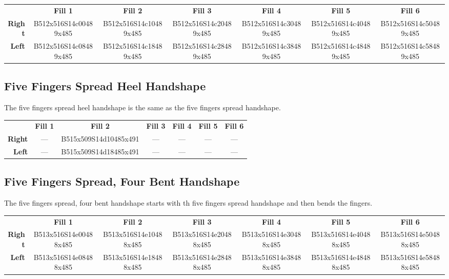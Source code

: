 \documentclass{article}
\begin{document}
\begin{center}
\begin{tabular}{r*{6}{c}}
&\textbf{Fill 1}&\textbf{Fill 2}&\textbf{Fill 3}&\textbf{Fill 4}&\textbf{Fill 5}&\textbf{Fill 6}\\
\textbf{Right}&
B512x516S14c00489x485&
B512x516S14c10489x485&
B512x516S14c20489x485&
B512x516S14c30489x485&
B512x516S14c40489x485&
B512x516S14c50489x485\\
\textbf{Left}&
B512x516S14c08489x485&
B512x516S14c18489x485&
B512x516S14c28489x485&
B512x516S14c38489x485&
B512x516S14c48489x485&
B512x516S14c58489x485\\
\end{tabular}
\end{center}

\subsection{Five Fingers Spread Heel Handshape}

The five fingers spread heel handshape is the same as the five fingers spread handshape.

\begin{center}
\begin{tabular}{r*{6}{c}}
&\textbf{Fill 1}&\textbf{Fill 2}&\textbf{Fill 3}&\textbf{Fill 4}&\textbf{Fill 5}&\textbf{Fill 6}\\
\textbf{Right}&
---&
B515x509S14d10485x491&
---&
---&
---&
---\\
\textbf{Left}&
---&
B515x509S14d18485x491&
---&
---&
---&
---\\
\end{tabular}
\end{center}

\subsection{Five Fingers Spread, Four Bent Handshape}

The five fingers spread, four bent handshape starts with th five fingers spread handshape and then bends the fingers.

\begin{center}
\begin{tabular}{r*{6}{c}}
&\textbf{Fill 1}&\textbf{Fill 2}&\textbf{Fill 3}&\textbf{Fill 4}&\textbf{Fill 5}&\textbf{Fill 6}\\
\textbf{Right}&
B513x516S14e00488x485&
B513x516S14e10488x485&
B513x516S14e20488x485&
B513x516S14e30488x485&
B513x516S14e40488x485&
B513x516S14e50488x485\\
\textbf{Left}&
B513x516S14e08488x485&
B513x516S14e18488x485&
B513x516S14e28488x485&
B513x516S14e38488x485&
B513x516S14e48488x485&
B513x516S14e58488x485\\
\end{tabular}
\end{center}
\end{document}
